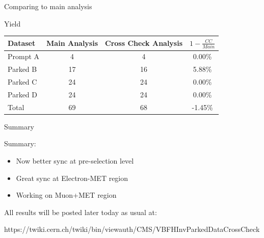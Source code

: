 \documentclass[8pt]{beamer}
\begin{document}
\begin{frame}{Comparing to main analysis} 
 
\begin{block}{Yield}

\centering

\begin{tabular}{|l|c|c|c|}
\hline
Dataset & Main Analysis & Cross Check Analysis & $1-\frac{CC}{Main}$ \\ 
\hline \hline
Prompt A &  4 &  4 & 0.00\% \\
Parked B & 17 & 16 & 5.88\% \\
Parked C & 24 & 24 & 0.00\% \\
Parked D & 24 & 24 & 0.00\% \\
\hline \hline
Total & 69 & 68 & -1.45\% \\
\hline
\end{tabular}

\end{block}

\end{frame}

\begin{frame}{Summary}
 
\begin{block}{Summary:}
 
\begin{itemize}
  \item Now better sync at pre-selection level
  \item Great sync at Electron-MET region
  \item Working on Muon+MET region
\end{itemize}

\end{block}

All results will be posted later today as usual at:
\begin{center}
https://twiki.cern.ch/twiki/bin/viewauth/CMS/VBFHInvParkedDataCrossCheck
\end{center}

\end{frame}
\end{document}

